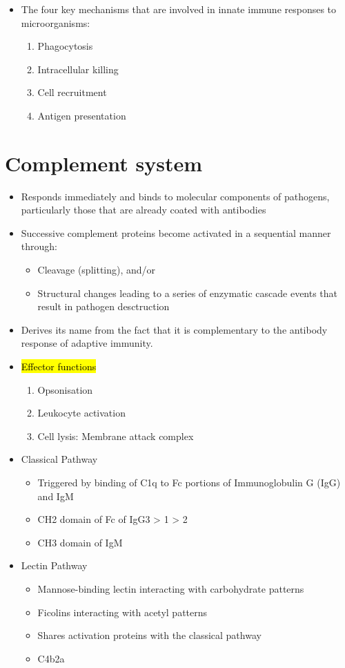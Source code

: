 \documentclass[a4paper, 12pt]{article}
\begin{document}
\begin{itemize}
\item{The four key mechanisms that are involved in innate immune responses to microorganisms:}
\begin{enumerate}
\item{Phagocytosis}
\item{Intracellular killing}
\item{Cell recruitment}
\item{Antigen presentation}
\end{enumerate}
\end{itemize}

\section{Complement system}
\begin{itemize}
\item{Responds immediately and binds to molecular components of pathogens, particularly those that are already coated with antibodies}
\item{Successive complement proteins become activated in a sequential manner through:}
\begin{itemize}
\item{Cleavage (splitting), and/or}
\item{Structural changes leading to a series of enzymatic cascade events that result in pathogen desctruction}
\end{itemize}
\item{Derives its name from the fact that it is complementary to the antibody response of adaptive immunity.}
\item{\hl{Effector functions}}
\begin{enumerate}
\item{Opsonisation}
\item{Leukocyte activation}
\item{Cell lysis: Membrane attack complex}
\end{enumerate}

\item{Classical Pathway}
\begin{itemize}
\item{Triggered by binding of C1q to Fc portions of Immunoglobulin G (IgG) and IgM}
\item{CH2 domain of Fc of IgG3 > 1 > 2}
\item{CH3 domain of IgM}
\end{itemize}

\item{Lectin Pathway}
\begin{itemize}
\item{Mannose-binding lectin interacting with carbohydrate patterns}
\item{Ficolins interacting with acetyl patterns}
\item{Shares activation proteins with the classical pathway}
\item{C4b2a}
\end{itemize}


\end{itemize}
\end{document}
